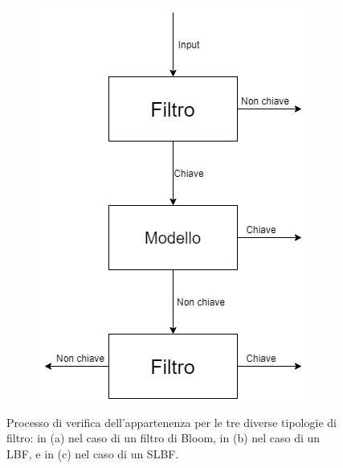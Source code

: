 \documentclass[../../main.tex]{subfiles}
\begin{document}
\begin{figure}[H]
\begin{subfigure}[c]{0.3\textwidth}
            \includegraphics[width=\textwidth]{immagini/5_2/SLBF.png}
            \caption{}
            \label{fig:appartenenzaSLBF}
        \end{subfigure}
        \caption{Processo di verifica dell'appartenenza per le tre diverse tipologie di filtro: in (a) nel caso di un filtro di Bloom, in (b) nel caso di un LBF, e in (c) nel caso di un SLBF.}
        \label{fig:DifferenzeFiltri}
    \end{figure}
\end{document}
